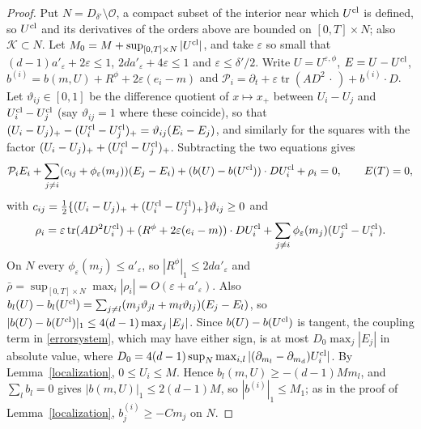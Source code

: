 \documentclass[11pt]{article}
\newcommand{\eps}{\varepsilon}
\begin{document}
\begin{proof}
Put $N=D_{\delta'}\setminus\mathcal O$, a compact subset of the interior near which $U^{\rm cl}$ is defined, so $U^{\rm cl}$ and its derivatives of the orders above are bounded on $[0,T]\times N$; also $\mathcal K\subset N$. Let $M_0=M+\sup_{[0,T]\times N}|U^{\rm cl}|$, and take $\eps$ so small that $(d-1)a'_\eps+2\eps\le1$, $2da'_\eps+4\eps\le1$ and $\eps\le\delta'/2$. Write $U=U^{\eps,\phi}$, $E=U-U^{\rm cl}$, $b^{(i)}=b(m,U)+R^\phi+2\eps(e_i-m)$ and $\mathcal P_i=\partial_t+\eps\operatorname{tr}(AD^2\,\cdot\,)+b^{(i)}\cdot D$. Let $\vartheta_{ij}\in[0,1]$ be the difference quotient of $x\mapsto x_+$ between $U_i-U_j$ and $U^{\rm cl}_i-U^{\rm cl}_j$ (say $\vartheta_{ij}=1$ where these coincide), so that $(U_i-U_j)_+-(U^{\rm cl}_i-U^{\rm cl}_j)_+=\vartheta_{ij}(E_i-E_j)$, and similarly for the squares with the factor $(U_i-U_j)_++(U^{\rm cl}_i-U^{\rm cl}_j)_+$. Subtracting the two equations gives
\begin{equation}\label{errorsystem}
 \mathcal P_iE_i+\sum_{j\ne i}(c_{ij}+\phi_\eps(m_j))(E_j-E_i)+(b(U)-b(U^{\rm cl}))\cdot DU^{\rm cl}_i+\rho_i=0,\qquad E(T)=0,
\end{equation}
with $c_{ij}=\frac12\{(U_i-U_j)_++(U^{\rm cl}_i-U^{\rm cl}_j)_+\}\vartheta_{ij}\ge0$ and
\[
 \rho_i=\eps\operatorname{tr}(AD^2U^{\rm cl}_i)+(R^\phi+2\eps(e_i-m))\cdot DU^{\rm cl}_i+\sum_{j\ne i}\phi_\eps(m_j)(U^{\rm cl}_j-U^{\rm cl}_i).
\]
On $N$ every $\phi_\eps(m_j)\le a'_\eps$, so $|R^\phi|_1\le2da'_\eps$ and $\bar\rho=\sup_{[0,T]\times N}\max_i|\rho_i|=O(\eps+a'_\eps)$. Also $b_l(U)-b_l(U^{\rm cl})=\sum_{j\ne l}(m_j\vartheta_{jl}+m_l\vartheta_{lj})(E_j-E_l)$, so $|b(U)-b(U^{\rm cl})|_1\le4(d-1)\max_j|E_j|$. Since $b(U)-b(U^{\rm cl})$ is tangent, the coupling term in \eqref{errorsystem}, which may have either sign, is at most $D_0\max_j|E_j|$ in absolute value, where $D_0=4(d-1)\sup_N\max_{i,l}|(\partial_{m_l}-\partial_{m_d})U^{\rm cl}_i|$. By Lemma~\ref{localization}, $0\le U_i\le M$. Hence $b_l(m,U)\ge-(d-1)Mm_l$, and $\sum_lb_l=0$ gives $|b(m,U)|_1\le2(d-1)M$, so $|b^{(i)}|_1\le M_1$; as in the proof of Lemma~\ref{localization}, $b^{(i)}_j\ge-Cm_j$ on $N$.


\end{proof}
\end{document}
